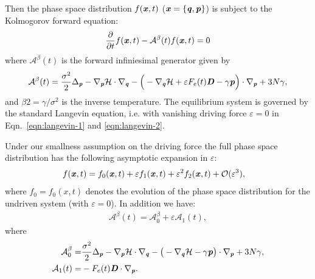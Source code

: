 \documentclass[aip,jcp,a4paper,reprint,onecolumn]{revtex4-1}
\newcommand{\vect}[1]{\textbf{\textit{#1}}}
\newcommand{\mh}{\mathcal H}
\newcommand{\eps}{\varepsilon}
\newcommand{\mo}{\mathcal O}
\newcommand{\fwg}{{\mathcal A}}
\begin{document}

Then the phase space distribution $f(\vect x, t)$ ($\vect x = \{\vect
q, \vect p\}$) is subject to the Kolmogorov forward equation:
\begin{align}\label{eqn:orig-forward}
  \frac{\partial}{\partial t} f(\vect x, t) - \fwg^\beta(t) f(\vect x, t) = 0
\end{align}
where $\fwg^\beta(t)$ is the forward infiniesimal generator given by
\begin{align}
  \fwg^\beta(t) =
  \frac{\sigma^2}2\Delta_{\vect p}
  - \nabla_{\vect p}\mh 
  \cdot\nabla_{\vect q}
  - \Big(
  -\nabla_{\vect q}\mh +
  \eps F_e(t)  \vect D  - \gamma\vect p
  \Big)\cdot\nabla_{\vect p}
  + 3N\gamma,
\end{align}
and $\beta2=\gamma / \sigma^2$ is the inverse temperature.
The equilibrium system
is governed by
the standard Langevin equation, i.e. with
vanishing driving force $\eps = 0$ in
Eqn.~\eqref{eqn:langevin-1} and \eqref{eqn:langevin-2}.

Under our smallness assumption on the driving force the full phase space distribution has the following asymptotic expansion in $\eps$:
\begin{align}\label{eqn:f-expan}
  f(\vect x, t) &= f_0(\vect x, t) + \eps f_1(\vect x, t)
  +\eps^2 f_2(\vect x, t) + \mo (\eps^3),
\end{align}
where $f_0=f_0(x,t)$ denotes the evolution of the phase space distribution for the undriven system (with $\eps=0$).
In addition we have:
\begin{align}\label{eqn:A-expan}
  \fwg^\beta(t) = \fwg^\beta_0 + \eps\fwg_1(t),
\end{align}
where
\begin{align}
  \fwg_0^\beta =&
  \frac{\sigma^2}2\Delta_{\vect p}
  -
  \nabla_{\vect p}\mh\cdot\nabla_{\vect q}
  - \big(
  -\nabla_{\vect q}\mh - \gamma\vect p
  \big)\cdot\nabla_{\vect p}
  + 3N\gamma,\\
  \fwg_1(t) =&
  - F_e(t)  \vect D \cdot\nabla_{\vect p}.
\end{align}
\end{document}
